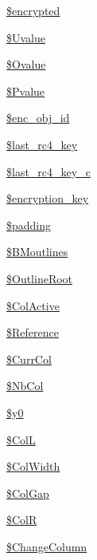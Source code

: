 \begin{DoxyCompactItemize}
\item 
\hyperlink{classm_p_d_f_ae5c9e37cf2c83323ac861e3689477e5e}{\$encrypted}
\item 
\hyperlink{classm_p_d_f_a4987e5027c7120313961e48e9e0cd333}{\$\-Uvalue}
\item 
\hyperlink{classm_p_d_f_aef5bb0c65068a9cc33325ce6deb98f33}{\$\-Ovalue}
\item 
\hyperlink{classm_p_d_f_a730754a3371fcff860fb1e0af88e4a71}{\$\-Pvalue}
\item 
\hyperlink{classm_p_d_f_a3cffb98f1aed88500f29cdf7a14c8d14}{\$enc\-\_\-obj\-\_\-id}
\item 
\hyperlink{classm_p_d_f_a415bc2290864597092510d0aaa1c5d11}{\$last\-\_\-rc4\-\_\-key}
\item 
\hyperlink{classm_p_d_f_aef4cce15bc26306cf509f8c969adec0f}{\$last\-\_\-rc4\-\_\-key\-\_\-c}
\item 
\hyperlink{classm_p_d_f_ae6a6d3d1eba83d192b5a4cf260812bf1}{\$encryption\-\_\-key}
\item 
\hyperlink{classm_p_d_f_a25bc595e56572f72017112f5e3d39530}{\$padding}
\item 
\hyperlink{classm_p_d_f_aa03b61b6fc491112d617ac894f4bd0aa}{\$\-B\-Moutlines}
\item 
\hyperlink{classm_p_d_f_a9462c2c4db5a1b4615531225eaffacfa}{\$\-Outline\-Root}
\item 
\hyperlink{classm_p_d_f_a1a3151a1fd57c33458fe2f6c487358f9}{\$\-Col\-Active}
\item 
\hyperlink{classm_p_d_f_a22a8986f8422e97942089945535172d5}{\$\-Reference}
\item 
\hyperlink{classm_p_d_f_a22d6f27f999c4d59c763ba55a6218c2e}{\$\-Curr\-Col}
\item 
\hyperlink{classm_p_d_f_a9bc00863cf175dad1e73e87e784b9b4d}{\$\-Nb\-Col}
\item 
\hyperlink{classm_p_d_f_a9b0e63c94eee115fac7e8ec8f8016683}{\$y0}
\item 
\hyperlink{classm_p_d_f_a7a40d8a13d490c6f1c401df5e567cd79}{\$\-Col\-L}
\item 
\hyperlink{classm_p_d_f_a47842dc62b6cc8bfb1cff7eeac7d063b}{\$\-Col\-Width}
\item 
\hyperlink{classm_p_d_f_afd09d79d07fa49c58709c8c5772e0832}{\$\-Col\-Gap}
\item 
\hyperlink{classm_p_d_f_a4b532ad7031530ab66a0ea4d1c7af7d6}{\$\-Col\-R}
\item 
\hyperlink{classm_p_d_f_af479c3d0ffe2fa21c84e24d08f04d414}{\$\-Change\-Column}
\item 

\end{DoxyCompactItemize}
